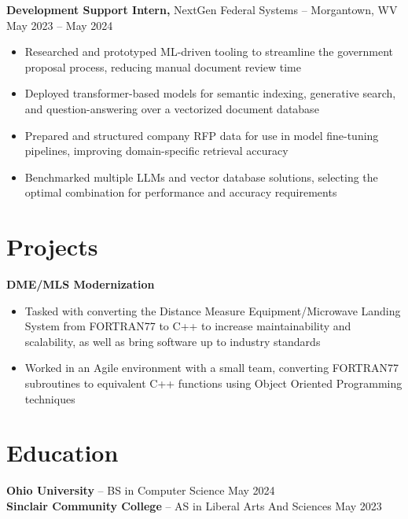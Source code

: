 \documentclass[11pt]{article}       %
\begin{document}
\textbf{Development Support Intern,} {NextGen Federal Systems} -- Morgantown, WV \hfill May 2023 -- May 2024 \\
\vspace{-9pt}
\begin{itemize}
    \item Researched and prototyped ML-driven tooling to streamline the government proposal process, reducing manual document review time
    \item Deployed transformer-based models for semantic indexing, generative search, and question-answering over a vectorized document database
    \item Prepared and structured company RFP data for use in model fine-tuning pipelines, improving domain-specific retrieval accuracy
    \item Benchmarked multiple LLMs and vector database solutions, selecting the optimal combination for performance and accuracy requirements
\end{itemize}

\vspace{-18.5pt}

\section*{Projects}
\textbf{DME/MLS Modernization}
\vspace{-9pt}
\begin{itemize}
    \item Tasked with converting the Distance Measure Equipment/Microwave Landing System from FORTRAN77 to C++ to increase maintainability and scalability, as well as bring software up to industry standards
    \item Worked in an Agile environment with a small team, converting FORTRAN77 subroutines to equivalent C++ functions using Object Oriented Programming techniques
\end{itemize}




\vspace{-18.5pt}

\section*{Education}
\textbf{Ohio University} -- BS in Computer Science \hfill May 2024 \\
\textbf{Sinclair Community College} -- AS in Liberal Arts And Sciences \hfill May 2023 \\
\end{document}
